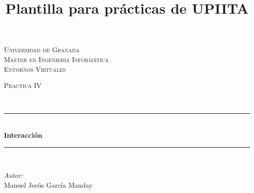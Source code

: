 \documentclass[10pt]{article}
\title{Plantilla para prácticas de UPIITA}
\begin{document}
\begin{center}																		%
\newcommand{\HRule}{\rule{\linewidth}{0.5mm}}									%
\begin{minipage}{0.48\textwidth} \begin{flushleft}
\end{flushleft}\end{minipage}
\begin{minipage}{0.48\textwidth} \begin{flushright}
\end{flushright}\end{minipage}

\vspace*{0.25cm}								%
\textsc{\huge Universidad de Granada}\\[1.5cm]	

\textsc{\LARGE Master en Ingeniería Informática}\\[1.5cm]													%

\textsc{\LARGE Entornos Virtuales}\\[1.5cm]													%

\begin{minipage}{0.9\textwidth} 
\begin{center}																					%
\textsc{\LARGE Practica IV}
\end{center}
\end{minipage}\\[0.5cm]
 			\vspace*{1cm}																		%
\HRule \\[0.4cm]																	%
{ \huge \bfseries Interacción}\\[0.4cm]	%
\HRule \\[1.5cm]																	%
\begin{minipage}{0.46\textwidth}													%
\begin{flushleft} \large															%
\emph{Autor:}\\	
 Manuel Jesús García Manday
\end{flushleft}																		%
\end{minipage}		
\begin{minipage}{0.52\textwidth}		
\vspace{-0.6cm}											%
\begin{flushright} \large															%
\end{flushright}																	%
\end{minipage}	
\vspace*{1cm}
 	

\end{center}
\end{document}
